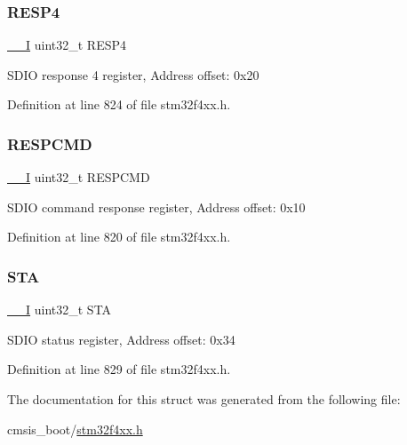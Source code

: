 \subsubsection{\texorpdfstring{R\+E\+S\+P4}{RESP4}}
{\footnotesize\ttfamily \hyperlink{group___c_m_s_i_s__core__definitions_gaf63697ed9952cc71e1225efe205f6cd3}{\+\_\+\+\_\+I} uint32\+\_\+t R\+E\+S\+P4}

S\+D\+IO response 4 register, Address offset\+: 0x20 

Definition at line 824 of file stm32f4xx.\+h.

\mbox{\label{struct_s_d_i_o___type_def_aad371db807e2db4a2edf05b3f2f4b6cd}} 
\subsubsection{\texorpdfstring{R\+E\+S\+P\+C\+MD}{RESPCMD}}
{\footnotesize\ttfamily \hyperlink{group___c_m_s_i_s__core__definitions_gaf63697ed9952cc71e1225efe205f6cd3}{\+\_\+\+\_\+I} uint32\+\_\+t R\+E\+S\+P\+C\+MD}

S\+D\+IO command response register, Address offset\+: 0x10 

Definition at line 820 of file stm32f4xx.\+h.

\mbox{\label{struct_s_d_i_o___type_def_a7520cdf6f3df68c2f147bdd87fb8a96f}} 
\subsubsection{\texorpdfstring{S\+TA}{STA}}
{\footnotesize\ttfamily \hyperlink{group___c_m_s_i_s__core__definitions_gaf63697ed9952cc71e1225efe205f6cd3}{\+\_\+\+\_\+I} uint32\+\_\+t S\+TA}

S\+D\+IO status register, Address offset\+: 0x34 

Definition at line 829 of file stm32f4xx.\+h.



The documentation for this struct was generated from the following file\+:\begin{DoxyCompactItemize}
\item 
cmsis\+\_\+boot/\hyperlink{stm32f4xx_8h}{stm32f4xx.\+h}\end{DoxyCompactItemize}
